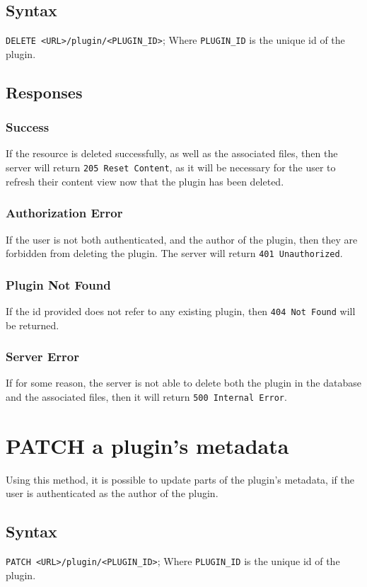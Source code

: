 \documentclass[a4paper, 12pt]{article}
\begin{document}
		\subsection{Syntax}
			\verb|DELETE <URL>/plugin/<PLUGIN_ID>|; \footnotesize{Where \verb|PLUGIN_ID| is the unique id of the plugin.}

		\subsection{Responses}
			\subsubsection{Success}
				If the resource is deleted successfully, as well as the associated files, then the server will return \verb|205 Reset Content|, as it will be necessary for the user to refresh their content view now that the plugin has been deleted.

			\subsubsection{Authorization Error}
				If the user is not both authenticated, and the author of the plugin, then they are forbidden from deleting the plugin. The server will return \verb|401 Unauthorized|.

			\subsubsection{Plugin Not Found}
				If the id provided does not refer to any existing plugin, then \verb|404 Not Found| will be returned.

			\subsubsection{Server Error}
				If for some reason, the server is not able to delete both the plugin in the database and the associated files, then it will return \verb|500 Internal Error|.

	\section{PATCH a plugin's metadata}
		Using this method, it is possible to update parts of the plugin's metadata, if the user is authenticated as the author of the plugin.

		\subsection{Syntax}
			\verb|PATCH <URL>/plugin/<PLUGIN_ID>|; \footnotesize{Where \verb|PLUGIN_ID| is the unique id of the plugin.}
\end{document}
